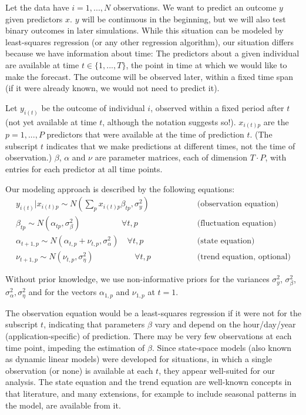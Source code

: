 \documentclass{article}
\begin{document}
Let the data have $i = 1, ..., N$ observations. We want to predict an outcome $y$ given predictors $x$. $y$ will be continuous in the beginning, but we will also test binary outcomes in later simulations. While this situation can be modeled by least-squares regression (or any other regression algorithm), our situation differs because we have information about time: The predictors about a given individual are available at time $t \in \{1, ..., T\}$, the point in time at which we would like to make the forecast. The outcome will be observed later, within a fixed time span (if it were already known, we would not need to predict it).

Let $y_{i(t)}$ be the outcome of individual $i$, observed within a fixed period after $t$ (not yet available at time $t$, although the notation suggests so!). $x_{i(t)p}$ are the $p = 1, ..., P$ predictors that were available at the time of prediction $t$. (The subscript $t$ indicates that we make predictions at different times, not the time of observation.) $\beta$, $\alpha$ and $\nu$ are parameter matrices, each of dimension $T \cdot P$, with entries for each predictor at all time points.

Our modeling approach is described by the following equations:
\begin{eqnarray}
y_{i(t)} | x_{i(t)p} \sim N(\sum_p x_{i(t)p} \beta_{tp}, \sigma_y^2) \textrm{~~~~~~~~~~~~~~~} & \textrm{(observation equation)} \\
\beta_{tp} \sim N(\alpha_{tp}, \sigma^2_{\beta}) \textrm{~~~~~~~~~~~~~~~} \forall t,p \textrm{~~~~~~~} & \textrm{(fluctuation equation)} \\
\alpha_{t+1,p} \sim N(\alpha_{t,p} + \nu_{t,p}, \sigma^2_{\alpha}) \textrm{~~~} \forall t,p \textrm{~~~~~~~} & \textrm{(state equation)} \\
\nu_{t+1,p} \sim N(\nu_{t,p}, \sigma^2_{\eta})\textrm{~~~~~~~~~~~~~~~} \forall t,p\textrm{~~~~~~~} & \textrm{(trend equation, optional)}
\end{eqnarray}

Without prior knowledge, we use non-informative priors for the variances $\sigma_y^2$, $\sigma^2_{\beta}$, $\sigma^2_{\alpha}, \sigma^2_{\eta}$ and for the vectors $\alpha_{1,p}$ and $\nu_{1,p}$ at $t=1$.

The observation equation would be a least-squares regression if it were not for the subscript $t$, indicating that parameters $\beta$ vary and depend on the hour/day/year (application-specific) of prediction. There may be very few observations at each time point, impeding the estimation of $\beta$. Since state-space models (also known as dynamic linear models) \citep{prado_time_2010, shumway_time_2011, durbin_time_2012} were developed for situations, in which a single observation (or none) is available at each $t$, they appear well-suited for our analysis. The state equation and the trend equation are well-known concepts in that literature, and many extensions, for example to include seasonal patterns in the model, are available from it.
\end{document}

